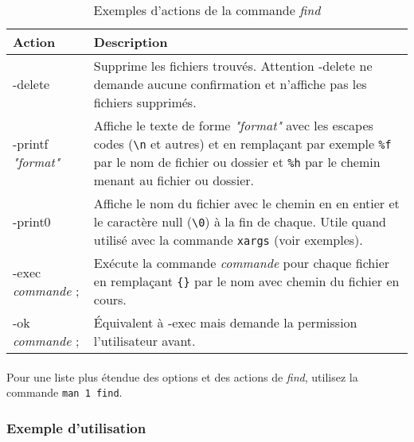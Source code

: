 \begin{table}[h]
	\centering
    \begin{tabular}{|l|p{10cm}|}
        \hline
        \textbf{Action} & \textbf{Description}\\
        \hline
        -delete                   & Supprime les fichiers trouvés. Attention
                                    -delete ne demande aucune confirmation et
									n'affiche pas les fichiers supprimés.\\
        \hline
        -printf \textit{"format"} & Affiche le texte de forme
                                    \textit{"format"} avec les escapes codes
									(\texttt{\textbackslash n} et autres) et en
									remplaçant par exemple \texttt{\%f} par le
									nom de fichier ou dossier et \texttt{\%h}
									par le chemin menant au fichier ou
									dossier.\\
		\hline
		-print0                   & Affiche le nom du fichier avec le chemin en
                                    en entier et le caractère null
									(\texttt{\textbackslash 0}) à la fin de
									chaque. Utile quand utilisé avec la
									commande \texttt{xargs} (voir exemples).\\
        \hline
		-exec \textit{commande} ; & Exécute la commande \textit{commande} pour
                                    chaque fichier en remplaçant \texttt{\{\}}
									par le nom avec chemin du fichier en
									cours.\\
		\hline
		-ok \textit{commande} ;   & Équivalent à -exec mais demande la
                                    permission l'utilisateur avant.\\
		\hline
    \end{tabular}
	\caption{Exemples d'actions de la commande \emph{find}}
	\label{tab:find-acts}
\end{table}

\pagebreak
\paragraph{}
Pour une liste plus étendue des options et des actions de \emph{find}, utilisez
la commande \lstinline|man 1 find|.

\subsubsection*{Exemple d'utilisation}

